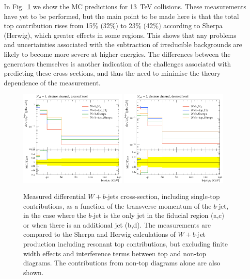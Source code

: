 \documentclass[11pt]{cernrep}
\begin{document}
In Fig.~\ref{fig:13tev} we show the MC predictions for 13~TeV collisions. These measurements have yet to be performed, but the main point to be made here is that
the total top contribution rises from 15\% (32\%) to 23\% (42\%) according to Sherpa (Herwig), which greater effects in some regions. 
This shows that any problems and uncertainties associated with the
subtraction of irreducible backgrounds are likely to become more severe at higher energies. The differences between the generators themselves is another indication of the 
challenges associated with predicting these cross sections, and thus the need to minimise the theory dependence of the measurement.
  
\begin{figure}
\centering
	\includegraphics[width=0.48\textwidth]{13tev-1jet.pdf}
	\includegraphics[width=0.48\textwidth]{13tev-2jet.pdf}
\caption{\label{fig:13tev}
Measured differential $W+b$-jets cross-section, including single-top contributions, as a function of the transverse momentum of the $b$-jet, 
in the case where the $b$-jet is the only jet in the fiducial region (a,c) or when there is an additional jet (b,d). 
The measurements are compared to the Sherpa and Herwig calculations of $W+b$-jet production including resonant top contributions, but excluding finite width effects 
and interference terms between top and non-top diagrams. The contributions from non-top diagrams alone are also shown.}
\end{figure}
\end{document}
